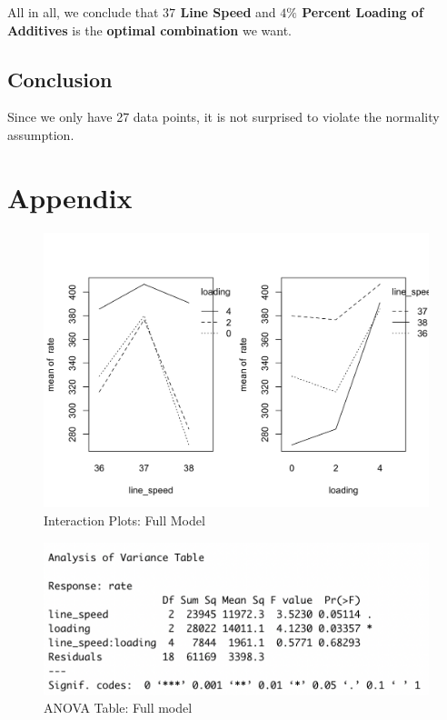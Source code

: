 \documentclass[11pt,a4paper]{article}
\begin{document}
All in all, we conclude that \textbf{$37$ Line Speed} and \textbf{$4\%$ Percent Loading of Additives} is the \textbf{optimal combination} we want.

\subsection{Conclusion}
Since we only have 27 data points, it is not surprised to violate the normality assumption.



\newpage
\section{Appendix}
\begin{figure}[htb]
    \centering
    \includegraphics[scale=0.3]{inter1.png}
    \caption{Interaction Plots: Full Model}
    \label{}
\end{figure}
\begin{figure}[htb]
    \centering
    \includegraphics[scale=0.8]{inter2.png}
    \caption{ANOVA Table: Full model}
    \label{}
\end{figure}
\end{document}
